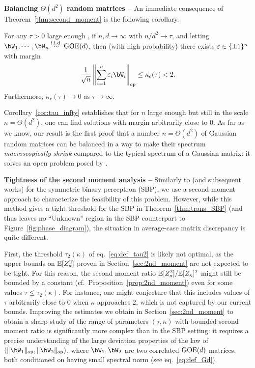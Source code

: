 \myskip
\textbf{Balancing $\Theta(d^2)$ random matrices -- }
An immediate consequence of Theorem~\ref{thm:second_moment} is the following corollary.
\begin{corollary}\label{cor:tau_infty}
    For any $\tau > 0$ large enough\footnotemark%
    , if $n,d \to \infty$ with $n / d^2 \to \tau$, and letting $\bW_1, \cdots, \bW_n \iid \GOE(d)$,
    then (with high probability) there exists $\varepsilon \in \{\pm 1\}^n$ with margin 
    \begin{equation*}
        \frac{1}{\sqrt{n}} \left\|\sum_{i=1}^n \eps_i \bW_i\right\|_\op \leq \kappa_c(\tau) < 2.
    \end{equation*}
    Furthermore, $\kappa_c(\tau) \to 0$ as $\tau \to \infty$.
\end{corollary}
\noindent
Corollary~\ref{cor:tau_infty} establishes that for $n$ large enough but still in the scale $n = \Theta(d^2)$, one can find solutions 
with margin arbitrarily close to $0$.
As far as we know, our result is the first proof that a number $n = \Theta(d^2)$ of Gaussian random matrices can be balanced in a way to make 
their spectrum \emph{macroscopically shrink} compared to the typical spectrum of a Gaussian matrix: it solves an open problem posed by \cite{kunisky2023online}.


\myskip
\textbf{Tightness of the second moment analysis --}
Similarly to \cite{aubin2019storage} (and subsequent works) for the symmetric binary perceptron (SBP), we use a second moment approach to characterize the feasibility of this problem.  
However, while this method gives a tight threshold for the SBP in Theorem~\ref{thm:trans_SBP} (and thus leaves no ``Unknown'' region in the SBP counterpart to Figure~\ref{fig:phase_diagram}),
the situation in average-case matrix discrepancy is quite different.

\myskip
First, the threshold $\tau_2(\kappa)$ of eq.~\eqref{eq:def_tau2} is likely not optimal, 
as the upper bounds on $\mathbb{E}[Z_\kappa^2]$ proven in Section~\ref{sec:2nd_moment} are not expected to be tight.
For this reason, the second moment ratio $\mathbb{E}[Z_\kappa^2]/\mathbb{E}[Z_\kappa]^2$ might still be bounded by a constant (cf.\ Proposition~\ref{prop:2nd_moment}) even for some values $\tau \leq \tau_2(\kappa)$. 
For instance, one might conjecture that this includes values of $\tau$ arbitrarily close to $0$ when $\kappa$ approaches $2$, which is not captured by our current bounds.
Improving the estimates we obtain in Section~\ref{sec:2nd_moment} to obtain a sharp study of the range of parameters $(\tau, \kappa)$ with bounded second moment ratio is significantly more complex than in the SBP setting:
it requires a precise understanding of the large deviation properties of the law of $(\|\bW_1\|_\op, \|\bW_2\|_\op)$, where $\bW_1, \bW_2$ are two correlated $\mathrm{GOE}(d)$ matrices, both conditioned on having small spectral norm (see eq.~\eqref{eq:def_Gd}). 

